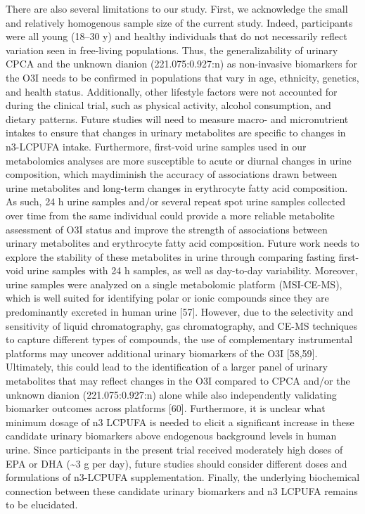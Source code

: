 \documentclass[journal=jacsat,manuscript=article]{achemso}
\begin{document}
There are also several limitations to our study. First, we acknowledge
the small and relatively homogenous sample size of the current study.
Indeed, participants were all young (18--30 y) and healthy individuals
that do not necessarily reflect variation seen in free-living
populations. Thus, the generalizability of urinary CPCA and the unknown
dianion (221.075:0.927:n) as non-invasive biomarkers for the O3I needs
to be confirmed in populations that vary in age, ethnicity, genetics,
and health status. Additionally, other lifestyle factors were not
accounted for during the clinical trial, such as physical activity,
alcohol consumption, and dietary patterns. Future studies will need to
measure macro- and micronutrient intakes to ensure that changes in
urinary metabolites are specific to changes in n3-LCPUFA intake.
Furthermore, first-void urine samples used in our metabolomics analyses
are more susceptible to acute or diurnal changes in urine composition,
which maydiminish the accuracy of associations drawn between urine
metabolites and long-term changes in erythrocyte fatty acid composition.
As such, 24 h urine samples and/or several repeat spot urine samples
collected over time from the same individual could provide a more
reliable metabolite assessment of O3I status and improve the strength of
associations between urinary metabolites and erythrocyte fatty acid
composition. Future work needs to explore the stability of these
metabolites in urine through comparing fasting first-void urine samples
with 24 h samples, as well as day-to-day variability. Moreover, urine
samples were analyzed on a single metabolomic platform (MSI-CE-MS),
which is well suited for identifying polar or ionic compounds since they
are predominantly excreted in human urine {[}57{]}. However, due to the
selectivity and sensitivity of liquid chromatography, gas
chromatography, and CE-MS techniques to capture different types of
compounds, the use of complementary instrumental platforms may uncover
additional urinary biomarkers of the O3I {[}58,59{]}. Ultimately, this
could lead to the identification of a larger panel of urinary
metabolites that may reflect changes in the O3I compared to CPCA and/or
the unknown dianion (221.075:0.927:n) alone while also independently
validating biomarker outcomes across platforms {[}60{]}. Furthermore, it
is unclear what minimum dosage of n3 LCPUFA is needed to elicit a
significant increase in these candidate urinary biomarkers above
endogenous background levels in human urine. Since participants in the
present trial received moderately high doses of EPA or DHA
(\textasciitilde3 g per day), future studies should consider different
doses and formulations of n3-LCPUFA supplementation. Finally, the
underlying biochemical connection between these candidate urinary
biomarkers and n3 LCPUFA remains to be elucidated.
\end{document}
